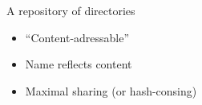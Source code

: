 \documentclass[ignorenonframetext,red]{beamer}
\begin{document}
\begin{frame}{A repository of directories}
\begin{center}
\begin{overlayarea}{\textwidth}{14em}
\begin{center}
      \end{center}
    \end{overlayarea}
  \end{center}%
  \begin{itemize}\small %
  \item<7-> ``Content-adressable''%
  \item<8-> Name reflects content%
  \item<9-> Maximal sharing (or hash-consing)%
  \end{itemize}%
\end{frame}
\end{document}

